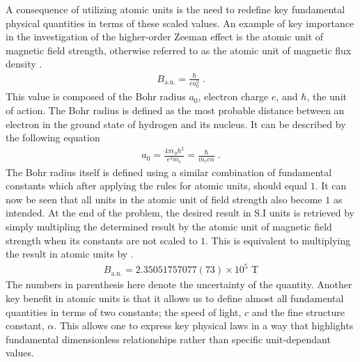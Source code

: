         A consequence of utilizing atomic units is the need to redefine key fundamental physical quantities in terms of these scaled values. An example of key importance in the investigation of the higher-order Zeeman effect is the atomic unit of magnetic field strength, otherwise referred to as the atomic unit of magnetic flux density \cite{Atomic_unit_of_field_strength}.
        \begin{align}
            B_{\text{a.u.}} = \frac{\hbar}{e a_0^2}\;.\label{eq:B_au}
        \end{align}
        \noindent This value is composed of the Bohr radius $a_0$, electron charge $e$, and $\hbar$, the unit of action. The Bohr radius is defined as the most probable distance between an electron in the ground state of hydrogen and its nucleus. It can be described by the following equation \cite{Griffiths_2018}
        \begin{align}
            a_0 = \frac{4\pi \epsilon_0 \hbar^2}{e^2 m_e} = \frac{\hbar}{m_e c \alpha} \label{eq:bohr_radius}\;.
        \end{align}
        \noindent The Bohr radius itself is defined using a similar combination of fundamental constants which after applying the rules for atomic units, should equal $1$. It can now be seen that all units in the atomic unit of field strength also become $1$ as intended. At the end of the problem, the desired result in S.I units is retrieved by simply multipling the determined result by the atomic unit of magnetic field strength when its constants are not scaled to $1$. This is equivalent to multiplying the result in atomic units by \cite{Atomic_unit_of_field_strength}.
        \begin{align}
            B_{\text{a.u.}} = 2.35051757077(73) \times 10^5 \text{ T}
        \end{align}
        \noindent The numbers in parenthesis here denote the uncertainty of the quantity. Another key benefit in atomic units is that it allows us to define almost all fundamental quantities in terms of two constants; the speed of light, $c$ and the fine structure constant, $\alpha$. This allows one to express key physical laws in a way that highlights fundamental dimensionless relationships rather than specific unit-dependant values.\\

